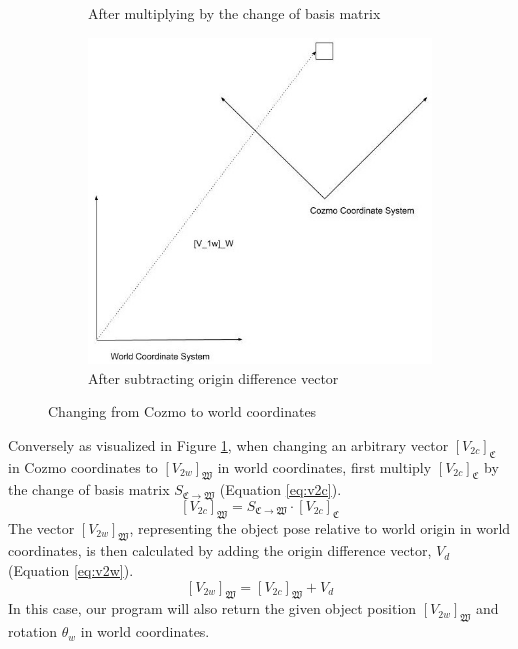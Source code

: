 \documentclass[jou,apacite]{apa6}
\begin{document}
\begin{figure}[h!]
\begin{subfigure}[b]{0.5\linewidth}
		\caption{After multiplying by the change of basis matrix}
	\end{subfigure}
	\begin{subfigure}[b]{0.5\linewidth}
		\includegraphics[width=\linewidth]{cw3.jpg}
		\caption{After subtracting origin difference vector}
	\end{subfigure}
	\caption{Changing from Cozmo to world coordinates}
	\label{fig:ctow}
\end{figure}

Conversely as visualized in Figure \ref{fig:ctow}, when changing an arbitrary vector $[V_{2c}]_\mathfrak{C}$ in Cozmo coordinates to $[V_{2w}]_\mathfrak{W}$ in world coordinates, first multiply $[V_{2c}]_\mathfrak{C}$ by the change of basis matrix $S_{\mathfrak{C}\rightarrow\mathfrak{W}}$ (Equation \ref{eq:v2c}).
\begin{equation} \label{eq:v2c}
	[V_{2c}]_\mathfrak{W} = S_{\mathfrak{C}\rightarrow\mathfrak{W}} \cdot [V_{2c}]_\mathfrak{C}
\end{equation}
The vector $[V_{2w}]_\mathfrak{W}$, representing the object pose relative to world origin in world coordinates, is then calculated by adding the origin difference vector, $V_d$ (Equation \ref{eq:v2w}).
\begin{equation} \label{eq:v2w}
	[V_{2w}]_\mathfrak{W} = [V_{2c}]_\mathfrak{W}+ V_d
\end{equation}
In this case, our program will also return the given object position $[V_{2w}]_\mathfrak{W}$ and rotation $\theta_w$ in world coordinates.
\end{document}
